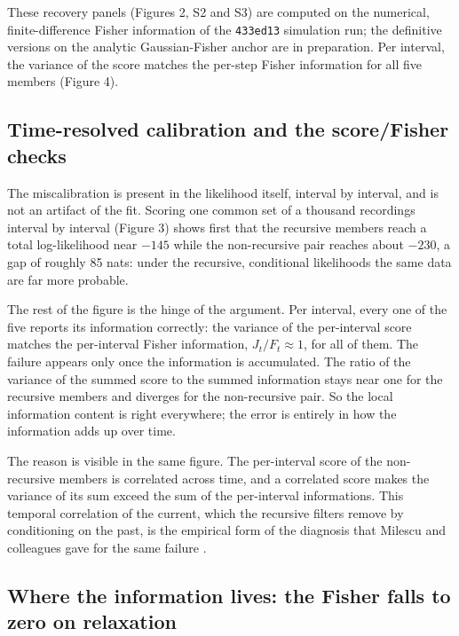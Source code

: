 These recovery panels (Figures 2, S2 and S3) are computed on the numerical, finite-difference Fisher information of the \texttt{433ed13} simulation run; the definitive versions on the analytic Gaussian-Fisher anchor are in preparation. %
Per interval, the variance of the score matches the per-step Fisher information for all five members (Figure 4). %

\subsection*{Time-resolved calibration and the score/Fisher checks}

The miscalibration is present in the likelihood itself, interval by interval, and is not an artifact of the fit. Scoring one common set of a thousand recordings interval by interval (Figure 3) shows first that the recursive members reach a total log-likelihood near $-145$ while the non-recursive pair reaches about $-230$, a gap of roughly 85 nats: under the recursive, conditional likelihoods the same data are far more probable. %

The rest of the figure is the hinge of the argument. Per interval, every one of the five reports its information correctly: the variance of the per-interval score matches the per-interval Fisher information, $J_t/F_t \approx 1$, for all of them. %
The failure appears only once the information is accumulated. The ratio of the variance of the summed score to the summed information stays near one for the recursive members and diverges for the non-recursive pair. %
So the local information content is right everywhere; the error is entirely in how the information adds up over time.

The reason is visible in the same figure. The per-interval score of the non-recursive members is correlated across time, and a correlated score makes the variance of its sum exceed the sum of the per-interval informations. This temporal correlation of the current, which the recursive filters remove by conditioning on the past, is the empirical form of the diagnosis that Milescu and colleagues gave for the same failure \cite{milescu2005maximum}.

\subsection*{Where the information lives: the Fisher falls to zero on relaxation}

